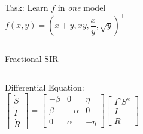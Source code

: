 \documentclass[aspectratio=169,professionalfont,xcolor={dvipsnames},hyperref={colorlinks=true,urlcolor=MidnightBlue}]{beamer}
\begin{document}
\begin{frame}
  \begin{columns}
    \centering
    Task: Learn $f$ in \emph{one} model
    \begin{equation*}
      f(x,y) = (x+y, xy, \frac{x}{y}, \sqrt{y})^\intercal
    \end{equation*}

  \end{columns}
\end{frame}

\begin{frame}{Fractional SIR}
  \begin{columns}
    \centering
    \resizebox{\textwidth}{!}{}

    \centering
    Differential Equation:
    \begin{equation*}
      \begin{bmatrix}
        \dot S \\ \dot I \\ \dot R
      \end{bmatrix}
      =
      \begin{bmatrix}
        -\beta & 0 & \eta \\
        \beta & -\alpha & 0 \\
        0 & \alpha & -\eta
      \end{bmatrix}
      \begin{bmatrix}
        I^\gamma S^\kappa \\ I \\ R
      \end{bmatrix}
    \end{equation*}
  \end{columns}
\end{frame}
\end{document}
